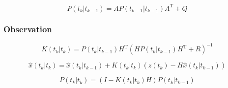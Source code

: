 \documentclass[a4paper]{report}
\numberwithin{equation}{chapter}
\begin{document}
\begin{equation}
P \left( t_k|t_{k-1} \right) = A P \left( t_{k-1}|t_{k-1} \right) A^{\mathrm{T}} + Q
\end{equation}

\subsubsection[Observation]{Observation}

\begin{equation}
K \left( t_k|t_k \right) = P \left( t_k|t_{k-1} \right) H^{\mathrm{T}} \left( HP \left( t_k|t_{k-1} \right) H^{\mathrm{T}} + R \right) ^{-1}
\end{equation}

\begin{equation}
\hat{x} \left( t_k|t_k \right) = \hat{x} \left( t_k|t_{k-1} \right) + K \left( t_k|t_k \right) \left( z \left(t_k \right) - H\hat{x} \left( t_k|t_{k-1} \right) \right)
\end{equation}

\begin{equation}
P \left( t_k|t_k \right) = \left( I - K \left( t_k|t_k \right)H \right) P \left( t_k|t_{k-1} \right)
\end{equation}
\end{document}
